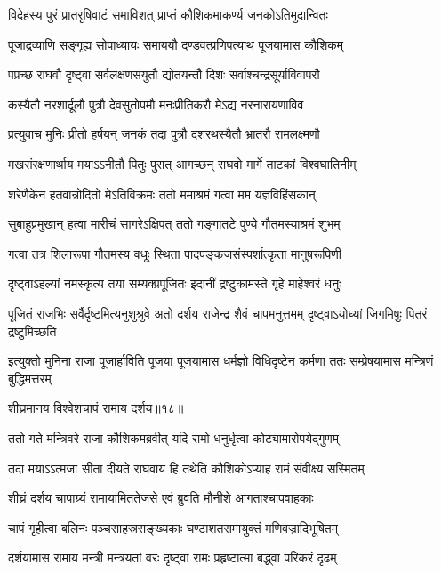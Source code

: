 \twolineshloka
{विदेहस्य पुरं प्रातरृषिवाटं समाविशत्}
{प्राप्तं कौशिकमाकर्ण्य जनकोऽतिमुदान्वितः} %

\twolineshloka
{पूजाद्रव्याणि सङ्गृह्य सोपाध्यायः समाययौ}
{दण्डवत्प्रणिपत्याथ पूजयामास कौशिकम्} %

\twolineshloka
{पप्रच्छ राघवौ दृष्ट्वा सर्वलक्षणसंयुतौ}
{द्योतयन्तौ दिशः सर्वाश्चन्द्रसूर्याविवापरौ} %

\twolineshloka
{कस्यैतौ नरशार्दूलौ पुत्रौ देवसुतोपमौ}
{मनःप्रीतिकरौ मेऽद्य नरनारायणाविव} %

\twolineshloka
{प्रत्युवाच मुनिः प्रीतो हर्षयन् जनकं तदा}
{पुत्रौ दशरथस्यैतौ भ्रातरौ रामलक्ष्मणौ} %

\twolineshloka
{मखसंरक्षणार्थाय मयाऽऽनीतौ पितुः पुरात्}
{आगच्छन् राघवो मार्गे ताटकां विश्वघातिनीम्} %

\twolineshloka
{शरेणैकेन हतवान्नोदितो मेऽतिविक्रमः}
{ततो ममाश्रमं गत्वा मम यज्ञविहिंसकान्} %

\twolineshloka
{सुबाहुप्रमुखान् हत्वा मारीचं सागरेऽक्षिपत्}
{ततो गङ्गातटे पुण्ये गौतमस्याश्रमं शुभम्} %

\twolineshloka
{गत्वा तत्र शिलारूपा गौतमस्य वधूः स्थिता}
{पादपङ्कजसंस्पर्शात्कृता मानुषरूपिणी} %

\twolineshloka
{दृष्ट्वाऽहल्यां नमस्कृत्य तया सम्यक्प्रपूजितः}
{इदानीं द्रष्टुकामस्ते गृहे माहेश्वरं धनुः} %

\threelineshloka
{पूजितं राजभिः सर्वैर्दृष्टमित्यनुशुश्रुवे}
{अतो दर्शय राजेन्द्र शैवं चापमनुत्तमम्}
{दृष्ट्वाऽयोध्यां जिगमिषुः पितरं द्रष्टुमिच्छति} %

\threelineshloka
{इत्युक्तो मुनिना राजा पूजार्हाविति पूजया}
{पूजयामास धर्मज्ञो विधिदृष्टेन कर्मणा}
{ततः सम्प्रेषयामास मन्त्रिणं बुद्धिमत्तरम्} %


{शीघ्रमानय विश्वेशचापं रामाय दर्शय॥१८॥} %


\twolineshloka
{ततो गते मन्त्रिवरे राजा कौशिकमब्रवीत्}
{यदि रामो धनुर्धृत्वा कोट्यामारोपयेद्गुणम्} %

\twolineshloka
{तदा मयाऽऽत्मजा सीता दीयते राघवाय हि}
{तथेति कौशिकोऽप्याह रामं संवीक्ष्य सस्मितम्} %

\twolineshloka
{शीघ्रं दर्शय चापाग्र्यं रामायामिततेजसे}
{एवं ब्रुवति मौनीशे आगताश्चापवाहकाः} %

\twolineshloka
{चापं गृहीत्वा बलिनः पञ्चसाहस्रसङ्ख्यकाः}
{घण्टाशतसमायुक्तं मणिवज्रादिभूषितम्} %

\twolineshloka
{दर्शयामास रामाय मन्त्री मन्त्रयतां वरः}
{दृष्ट्वा रामः प्रहृष्टात्मा बद्ध्वा परिकरं दृढम्} %

